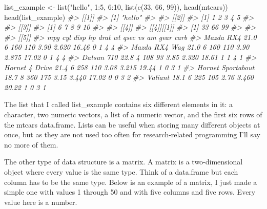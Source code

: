 \documentclass[
]{krantz}
\makeatletter
\newenvironment{Shaded}{\begin{snugshade}}{\end{snugshade}}
\newcommand{\CommentTok}[1]{\textcolor[rgb]{0.37,0.37,0.37}{\textit{#1}}}
\newcommand{\DecValTok}[1]{\textcolor[rgb]{0.06,0.06,0.06}{#1}}
\newcommand{\FunctionTok}[1]{\textcolor[rgb]{0,0,0}{#1}}
\newcommand{\NormalTok}[1]{#1}
\newcommand{\OtherTok}[1]{\textcolor[rgb]{0.37,0.37,0.37}{#1}}
\newcommand{\SpecialCharTok}[1]{\textcolor[rgb]{0,0,0}{#1}}
\newcommand{\StringTok}[1]{\textcolor[rgb]{0.5,0.5,0.5}{#1}}
\newenvironment{kframe}{%
\medskip{}
\setlength{\fboxsep}{.8em}
 \def\at@end@of@kframe{}%
 \ifinner\ifhmode%
  \def\at@end@of@kframe{\end{minipage}}%
  \begin{minipage}{\columnwidth}%
 \fi\fi%
 \def\FrameCommand##1{\hskip\@totalleftmargin \hskip-\fboxsep
 \colorbox{shadecolor}{##1}\hskip-\fboxsep
     \hskip-\linewidth \hskip-\@totalleftmargin \hskip\columnwidth}%
 \MakeFramed {\advance\hsize-\width
   \@totalleftmargin\z@ \linewidth\hsize
   \@setminipage}}%
 {\par\unskip\endMakeFramed%
 \at@end@of@kframe}
\renewenvironment{Shaded}{\begin{kframe}}{\end{kframe}}
\makeatother
\begin{document}
\begin{Shaded}
\begin{Highlighting}[]
\NormalTok{list\_example }\OtherTok{\textless{}{-}} \FunctionTok{list}\NormalTok{(}\StringTok{"hello"}\NormalTok{, }\DecValTok{1}\SpecialCharTok{:}\DecValTok{5}\NormalTok{, }\DecValTok{6}\SpecialCharTok{:}\DecValTok{10}\NormalTok{, }\FunctionTok{list}\NormalTok{(}\FunctionTok{c}\NormalTok{(}\DecValTok{33}\NormalTok{, }\DecValTok{66}\NormalTok{, }\DecValTok{99}\NormalTok{)), }\FunctionTok{head}\NormalTok{(mtcars))}
\FunctionTok{head}\NormalTok{(list\_example)}
\CommentTok{\#\textgreater{} [[1]]}
\CommentTok{\#\textgreater{} [1] "hello"}
\CommentTok{\#\textgreater{} }
\CommentTok{\#\textgreater{} [[2]]}
\CommentTok{\#\textgreater{} [1] 1 2 3 4 5}
\CommentTok{\#\textgreater{} }
\CommentTok{\#\textgreater{} [[3]]}
\CommentTok{\#\textgreater{} [1]  6  7  8  9 10}
\CommentTok{\#\textgreater{} }
\CommentTok{\#\textgreater{} [[4]]}
\CommentTok{\#\textgreater{} [[4]][[1]]}
\CommentTok{\#\textgreater{} [1] 33 66 99}
\CommentTok{\#\textgreater{} }
\CommentTok{\#\textgreater{} }
\CommentTok{\#\textgreater{} [[5]]}
\CommentTok{\#\textgreater{}                    mpg cyl disp  hp drat    wt  qsec vs am gear carb}
\CommentTok{\#\textgreater{} Mazda RX4         21.0   6  160 110 3.90 2.620 16.46  0  1    4    4}
\CommentTok{\#\textgreater{} Mazda RX4 Wag     21.0   6  160 110 3.90 2.875 17.02  0  1    4    4}
\CommentTok{\#\textgreater{} Datsun 710        22.8   4  108  93 3.85 2.320 18.61  1  1    4    1}
\CommentTok{\#\textgreater{} Hornet 4 Drive    21.4   6  258 110 3.08 3.215 19.44  1  0    3    1}
\CommentTok{\#\textgreater{} Hornet Sportabout 18.7   8  360 175 3.15 3.440 17.02  0  0    3    2}
\CommentTok{\#\textgreater{} Valiant           18.1   6  225 105 2.76 3.460 20.22  1  0    3    1}
\end{Highlighting}
\end{Shaded}

The list that I called list\_example contains six different elements in it: a character, two numeric vectors, a list of a numeric vector, and the first six rows of the mtcars data.frame. Lists can be useful when storing many different objects at once, but as they are not used too often for research-related programming I'll say no more of them.

The other type of data structure is a matrix. A matrix is a two-dimensional object where every value is the same type. Think of a data.frame but each column has to be the same type. Below is an example of a matrix, I just made a simple one with values 1 through 50 and with five columns and five rows. Every value here is a number.
\end{document}
